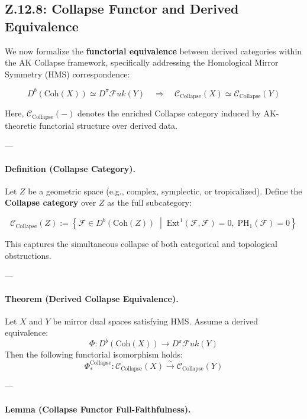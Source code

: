 \documentclass[11pt]{article}
\begin{document}
\begin{axiom}
\begin{axiom}
{{\subsection*{Z.12.8: Collapse Functor and Derived Equivalence}

We now formalize the \textbf{functorial equivalence} between derived categories within the AK Collapse framework,  
specifically addressing the Homological Mirror Symmetry (HMS) correspondence:

\[
D^b(\mathrm{Coh}(X)) \simeq D^\pi \mathcal{F}uk(Y)
\quad \Longrightarrow \quad
\mathcal{C}_{\text{Collapse}}(X) \simeq \mathcal{C}_{\text{Collapse}}(Y)
\]

Here, \( \mathcal{C}_{\text{Collapse}}(-) \) denotes the enriched Collapse category induced by AK-theoretic functorial structure over derived data.

---

\paragraph{Definition (Collapse Category).}

Let \( Z \) be a geometric space (e.g., complex, symplectic, or tropicalized).  
Define the \textbf{Collapse category} over \( Z \) as the full subcategory:

\[
\mathcal{C}_{\text{Collapse}}(Z) := \left\{
  \mathcal{F} \in D^b(\mathrm{Coh}(Z)) \;\middle|\;
  \mathrm{Ext}^1(\mathcal{F}, \mathcal{F}) = 0,\; \mathrm{PH}_1(\mathcal{F}) = 0
\right\}
\]

This captures the simultaneous collapse of both categorical and topological obstructions.

---

\paragraph{Theorem (Derived Collapse Equivalence).}

Let \( X \) and \( Y \) be mirror dual spaces satisfying HMS.  
Assume a derived equivalence:
\[
\Phi: D^b(\mathrm{Coh}(X)) \to D^\pi \mathcal{F}uk(Y)
\]
Then the following functorial isomorphism holds:
\[
\Phi_*^{\mathrm{Collapse}} : \mathcal{C}_{\text{Collapse}}(X) \xrightarrow{\sim} \mathcal{C}_{\text{Collapse}}(Y)
\]

---

\paragraph{Lemma (Collapse Functor Full-Faithfulness).}

}}
\end{axiom}
\end{axiom}
\end{document}

